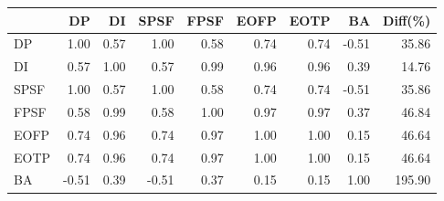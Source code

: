 \begin{tabular}{l|rrrrrrr|r}
\toprule
 & DP & DI & SPSF & FPSF & EOFP & EOTP & BA & Diff(\%)  \\
\midrule
DP & 1.00 & 0.57 & 1.00 & 0.58 & 0.74 & 0.74 & -0.51 & 35.86  \\
DI & 0.57 & 1.00 & 0.57 & 0.99 & 0.96 & 0.96 & 0.39 & 14.76  \\
SPSF & 1.00 & 0.57 & 1.00 & 0.58 & 0.74 & 0.74 & -0.51 & 35.86  \\
FPSF & 0.58 & 0.99 & 0.58 & 1.00 & 0.97 & 0.97 & 0.37 & 46.84  \\
EOFP & 0.74 & 0.96 & 0.74 & 0.97 & 1.00 & 1.00 & 0.15 & 46.64  \\
EOTP & 0.74 & 0.96 & 0.74 & 0.97 & 1.00 & 1.00 & 0.15 & 46.64  \\
BA & -0.51 & 0.39 & -0.51 & 0.37 & 0.15 & 0.15 & 1.00 & 195.90  \\
\bottomrule
\end{tabular}

